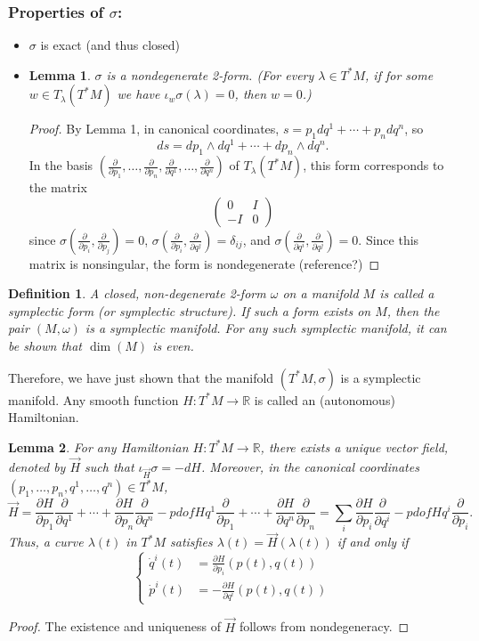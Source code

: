\documentclass{article}
\newcommand{\R}{\mathbb R}
\newcommand{\nl}{\newline\newline\noindent}
\newcommand{\w}{\omega}
\newcommand{\pd}[1]{\frac{\partial}{\partial #1}}
\newcommand{\pdof}[2]{\frac{\partial #1}{\partial #2}}
\newtheorem{defn}{Definition}
\newtheorem{lm}{Lemma}
\begin{document}
\subsubsection*{Properties of $\sigma$:}
\begin{itemize}
    \item $\sigma$ is exact (and thus closed)
    \item \begin{lm}
        $\sigma$ is a nondegenerate 2-form. (For every $\lambda\in T^*M$, if for some $w\in T_\lambda(T^*M)$ we have $\iota_w\sigma(\lambda)=0$, then $w=0$.)
    \end{lm}
    \begin{proof}
        By Lemma 1, in canonical coordinates, $s = p_1dq^1 + \cdots + p_ndq^n$, so
        \[ds = dp_1\wedge dq^1 + \cdots + dp_n\wedge dq^n.\]
        In the basis $\left(\pd{p_1},\dots,\pd{p_n},\pd{q^1},\dots,\pd{q^n}\right)$ of $T_\lambda(T^*M)$, this form corresponds to the matrix
        \[\left(\begin{array}{c|c}
            0 & I \\
            \hline
            -I & 0
        \end{array}\right)\]
        since $\sigma(\pd{p_i},\pd{p_j}) = 0$, $\sigma(\pd{p_i},\pd{q^j}) = \delta_{ij}$, and $\sigma(\pd{q^i},\pd{q^j}) = 0$. Since this matrix is nonsingular, the form is nondegenerate (reference?)
    \end{proof}
\end{itemize}
\begin{defn}
     A closed, non-degenerate 2-form $\w$ on a manifold $M$ is called a symplectic form (or symplectic structure). If such a form exists on $M$, then the pair $(M,\w)$ is a symplectic manifold. For any such symplectic manifold, it can be shown that $\dim(M)$ is even.
\end{defn}
Therefore, we have just shown that the manifold $(T^*M,\sigma)$ is a symplectic manifold.
\nl
Any smooth function $H:T^*M\to\R$ is called an (autonomous) Hamiltonian.
\begin{lm}
    For any Hamiltonian $H:T^*M\to \R$, there exists a unique vector field, denoted by $\vec{H}$ such that $\iota_{\vec H} \sigma = -dH$. Moreover, in the canonical coordinates $(p_1,\dots, p_n,q^1,\dots,q^n)\in T^*M$,
    \[\vec H = \pdof{H}{p_1}\pd{q^1}+\cdots + \pdof{H}{p_n}\pd{q^n} - pdof{H}{q^1}\pd{p_1}+\cdots + \pdof{H}{q^n}\pd{p_n} = \sum_{i} \pdof{H}{p_i}\pd{q^i} - pdof{H}{q^i}\pd{p_i}.\]
    Thus, a curve $\lambda(t)$ in $T^*M$ satisfies $\lambda(t) = \vec H(\lambda(t))$ if and only if 
    \[\left\{\begin{aligned}
        \dot q^i(t) &= \pdof{H}{p_i}(p(t), q(t))\\
        \dot p^i(t) &= -\pdof{H}{q^i}(p(t), q(t))
    \end{aligned}\right.\]
\end{lm}
\begin{proof}
    The existence and uniqueness of $\vec H$ follows from nondegeneracy.
\end{proof}
\end{document}
